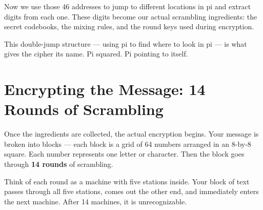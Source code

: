 \documentclass[12pt, a4paper]{article}
\begin{document}
Now we use those 46 addresses to jump to different locations in pi and extract digits from each one. These digits become our actual scrambling ingredients: the secret codebooks, the mixing rules, and the round keys used during encryption.


\vspace{0.8em}

This double-jump structure --- using pi to find where to look in pi --- is what gives the cipher its name. Pi squared. Pi pointing to itself.

\section{Encrypting the Message: 14 Rounds of Scrambling}

\vspace{0.5em}

Once the ingredients are collected, the actual encryption begins. Your message is broken into blocks --- each block is a grid of 64 numbers arranged in an 8-by-8 square. Each number represents one letter or character. Then the block goes through \textbf{14 rounds} of scrambling.

Think of each round as a machine with five stations inside. Your block of text passes through all five stations, comes out the other end, and immediately enters the next machine. After 14 machines, it is unrecognizable.
\end{document}
